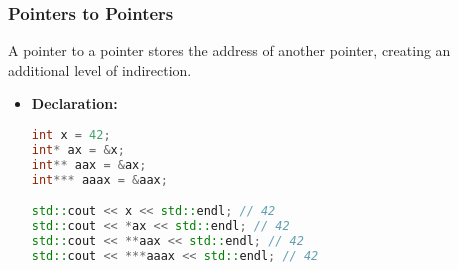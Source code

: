 \documentclass{article}
\begin{document}
\subsubsection{Pointers to Pointers}

\noindent  
A pointer to a pointer stores the address of another pointer, creating an additional level of indirection.

\begin{itemize}
    \item \textbf{Declaration:}
\begin{lstlisting}[language=C++]
int x = 42;
int* ax = &x;
int** aax = &ax;
int*** aaax = &aax;

std::cout << x << std::endl; // 42
std::cout << *ax << std::endl; // 42
std::cout << **aax << std::endl; // 42
std::cout << ***aaax << std::endl; // 42
\end{lstlisting}

\end{itemize}
\end{document}
